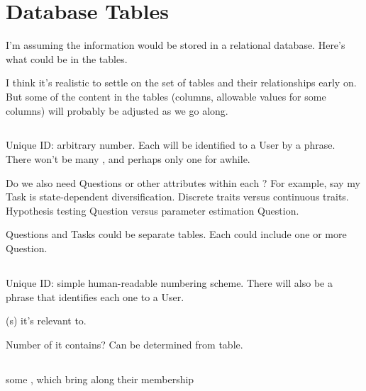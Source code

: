 \section{Database Tables}

I'm assuming the information would be stored in a relational database.
Here's what could be in the tables.

I think it's realistic to settle on the set of tables and their relationships early on.
But some of the content in the tables (columns, allowable values for some columns) will probably be adjusted as we go along.

\subsection{\Task}

Unique ID: arbitrary number.
Each \Task will be identified to a User by a phrase.
There won't be many \Tasks, and perhaps only one for awhile.

Do we also need Questions or other attributes within each \Task?
For example, say my Task is state-dependent diversification.
Discrete traits versus continuous traits.
Hypothesis testing Question versus parameter estimation Question.

Questions and Tasks could be separate tables.
Each \Task could include one or more Question.

\subsection{\Refset}

Unique ID: simple human-readable numbering scheme.
There will also be a phrase that identifies each one to a User.

\Task(s) it's relevant to.

Number of \Elements it contains?  Can be determined from \Elements table.

\subsection{\Benchmark}

some \Elements, which bring along their \Refset membership

